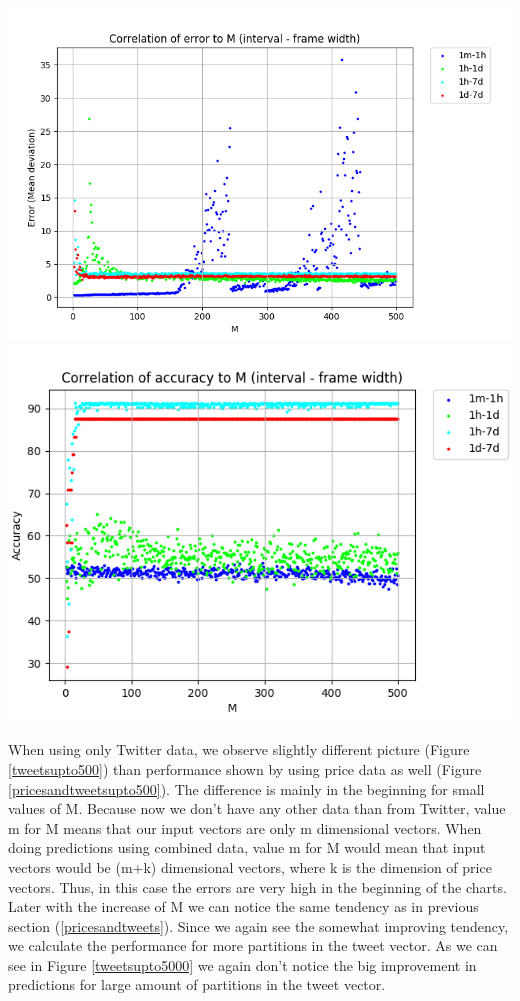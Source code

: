 \documentclass[a4paper,11pt,oneside]{article}
\begin{document}
  
  \begin{minipage}{\linewidth}
  	\includegraphics[width=0.57\linewidth]{./data/Tweets/ErrorVsTweetsN_2to500.png}
  	\includegraphics[width=0.53\linewidth]{./data/Tweets/AccuracyVsTweetsN_2to500.png}
  	\label{tweetsupto500}
  \end{minipage}%
  \hfill
  
  When using only Twitter data, we observe slightly different picture (Figure \ref{tweetsupto500}) than performance shown by using price data as well (Figure \ref{pricesandtweetsupto500}). The difference is mainly in the beginning for small values of M. Because now we don't have any other data than from Twitter, value m for M means that our input vectors are only m dimensional vectors. When doing predictions using combined data, value m for M would mean that input vectors would be (m+k) dimensional vectors, where k is the dimension of price vectors. Thus, in this case the errors are very high in the beginning of the charts. Later with the increase of M we can notice the same tendency as in previous section (\ref{pricesandtweets}). Since we again see the somewhat improving tendency, we calculate the performance for more partitions in the tweet vector. As we can see in Figure \ref{tweetsupto5000} we again don't notice the big improvement in predictions for large amount of partitions in the tweet vector. 
  
\end{document}
